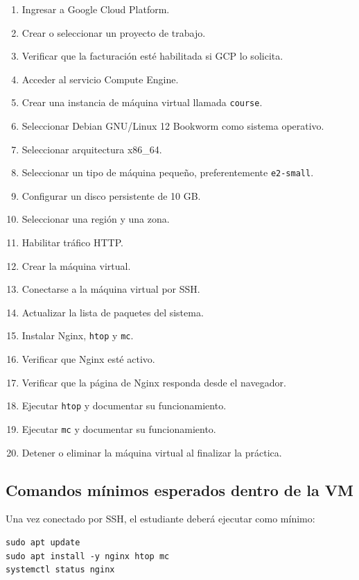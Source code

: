 \documentclass[
  coursetitle={Cómputo Nube y Tecnologías Emergentes},
  coursehours={96},
  coursedate={Verano 2026},
  doctype={Tarea 2},
  otherlangs={english,french},
  authorname={Lázaro},
  authorsurname={Bustio-Martínez},
  authortitle={PhD},
  role={Profesor Investigador},
  email={lbustio@inaoe.mx},
  phone={5559504000},
  ext={7459},
  institution={Instituto Nacional de Astrofísica, Óptica y Electrónica (INAOE)},
  department={Maestría en Ciencias en Tecnologías de Seguridad},
  address={Luis Enrique Erro 1, Sta. Ma. Tonantzintla, San Andrés Cholula, CP 72840, Puebla, México},
  margin={0.5in}
]{lbustio_lecture_notes}
\begin{document}
\begin{enumerate}
  \item Ingresar a Google Cloud Platform.
  \item Crear o seleccionar un proyecto de trabajo.
  \item Verificar que la facturación esté habilitada si GCP lo solicita.
  \item Acceder al servicio Compute Engine.
  \item Crear una instancia de máquina virtual llamada \texttt{course}.
  \item Seleccionar Debian GNU/Linux 12 Bookworm como sistema operativo.
  \item Seleccionar arquitectura x86\_64.
  \item Seleccionar un tipo de máquina pequeño, preferentemente \texttt{e2-small}.
  \item Configurar un disco persistente de 10 GB.
  \item Seleccionar una región y una zona.
  \item Habilitar tráfico HTTP.
  \item Crear la máquina virtual.
  \item Conectarse a la máquina virtual por SSH.
  \item Actualizar la lista de paquetes del sistema.
  \item Instalar Nginx, \texttt{htop} y \texttt{mc}.
  \item Verificar que Nginx esté activo.
  \item Verificar que la página de Nginx responda desde el navegador.
  \item Ejecutar \texttt{htop} y documentar su funcionamiento.
  \item Ejecutar \texttt{mc} y documentar su funcionamiento.
  \item Detener o eliminar la máquina virtual al finalizar la práctica.
\end{enumerate}

\subsection{Comandos mínimos esperados dentro de la VM}
\label{sec:tarea2-comandos}

Una vez conectado por SSH, el estudiante deberá ejecutar como mínimo:

\begin{verbatim}
sudo apt update
sudo apt install -y nginx htop mc
systemctl status nginx
\end{verbatim}
\end{document}
